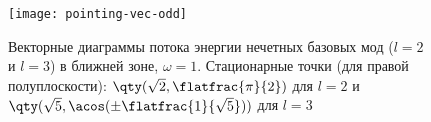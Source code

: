 \documentclass[\docroot/reports/draft/report.tex]{subfiles}
\begin{document}
    \begin{figure}[!htb]%
        \centering\texttt{[image: pointing-vec-odd]}%
        \caption[]{Векторные диаграммы потока энергии нечетных базовых мод ($l=2$ и $l=3$) в ближней зоне, $\omega = 1$. Стационарные точки (для правой полуплоскости): $\qty(\sqrt{2},\flatfrac{\pi}{2})$ для $l=2$ и $\qty(\sqrt{5},\acos(\pm\flatfrac{1}{\sqrt{5}}))$ для $l=3$}%
        \label{fig:Ui-vec-odd}%
    \end{figure}

\end{document}

